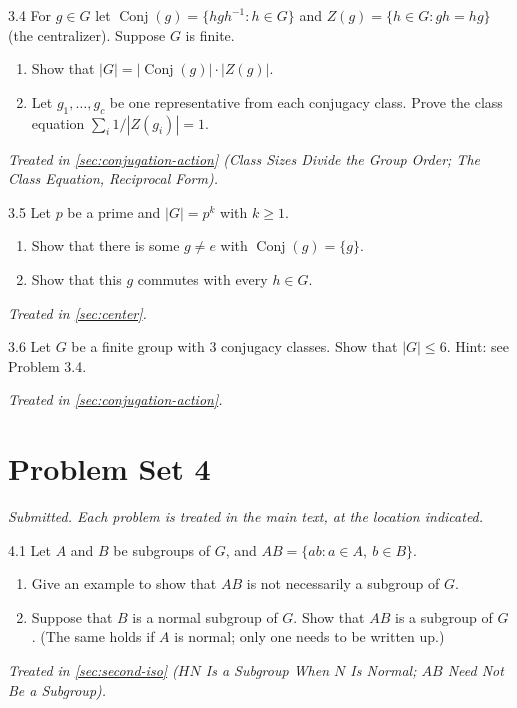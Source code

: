 \documentclass[11pt]{report}
\begin{document}
\begin{hwbox}{3.4}\label{hw:3.4}
For $g \in G$ let $\operatorname{Conj}(g) = \{hgh^{-1} : h \in G\}$ and $Z(g) = \{h \in G : gh = hg\}$ (the centralizer). Suppose $G$ is finite.
\begin{enumerate}
    \item Show that $|G| = |\operatorname{Conj}(g)| \cdot |Z(g)|$.
    \item Let $g_1, \ldots, g_c$ be one representative from each conjugacy class. Prove the class equation $\sum_i 1/|Z(g_i)| = 1$.
\end{enumerate}
\end{hwbox}
\textit{Treated in \ref{sec:conjugation-action} (Class Sizes Divide the Group Order; The Class Equation, Reciprocal Form).}

\begin{hwbox}{3.5}\label{hw:3.5}
Let $p$ be a prime and $|G| = p^k$ with $k \geq 1$.
\begin{enumerate}
    \item Show that there is some $g \neq e$ with $\operatorname{Conj}(g) = \{g\}$.
    \item Show that this $g$ commutes with every $h \in G$.
\end{enumerate}
\end{hwbox}
\textit{Treated in \ref{sec:center}.}

\begin{hwbox}{3.6}\label{hw:3.6}
Let $G$ be a finite group with $3$ conjugacy classes. Show that $|G| \leq 6$. Hint: see Problem 3.4.
\end{hwbox}
\textit{Treated in \ref{sec:conjugation-action}.}

\section*{Problem Set 4}
{}

\textit{Submitted. Each problem is treated in the main text, at the location indicated.}

\begin{hwbox}{4.1}\label{hw:4.1}
Let $A$ and $B$ be subgroups of $G$, and $AB = \{ab : a \in A,\ b \in B\}$.
\begin{enumerate}
    \item Give an example to show that $AB$ is not necessarily a subgroup of $G$.
    \item Suppose that $B$ is a normal subgroup of $G$. Show that $AB$ is a subgroup of $G$. (The same holds if $A$ is normal; only one needs to be written up.)
\end{enumerate}
\end{hwbox}
\textit{Treated in \ref{sec:second-iso} ($HN$ Is a Subgroup When $N$ Is Normal; $AB$ Need Not Be a Subgroup).}
\end{document}
